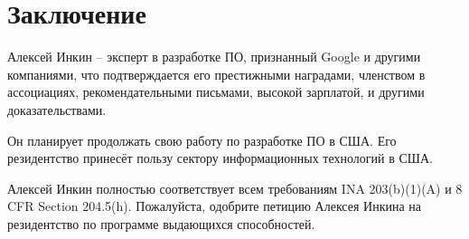 \section{Заключение}
\label{sec:Conclusion}

Алексей Инкин -- эксперт в разработке ПО, признанный Google и другими компаниями,
что подтверждается его престижными наградами, членством в ассоциациях, рекомендательными письмами,
высокой зарплатой, и другими доказательствами.

Он планирует продолжать свою работу по разработке ПО в США.
Его резидентство принесёт пользу сектору информационных технологий в США.

Алексей Инкин полностью соответствует всем требованиям INA 203(b)(1)(A) и 8 CFR Section 204.5(h).
Пожалуйста, одобрите петицию Алексея Инкина на резидентство по программе выдающихся способностей.

\pagebreak
